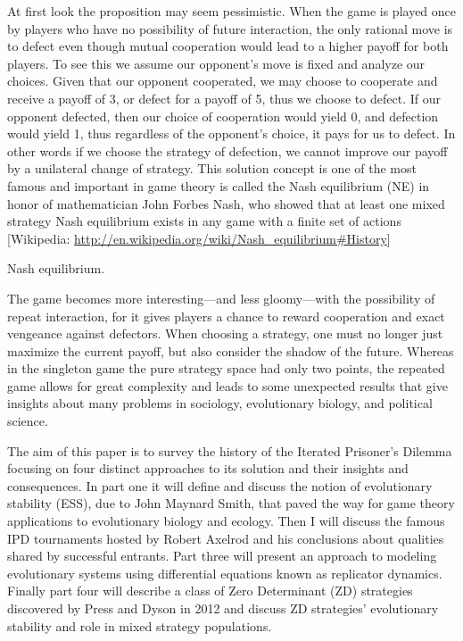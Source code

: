 At first look the proposition may seem pessimistic. When the game is played once by players who have no possibility of future interaction, the only rational move is to defect even though mutual cooperation would lead to a higher payoff for both players. To see this we assume our opponent's move is fixed and analyze our choices. Given that our opponent cooperated, we may choose to cooperate and receive a payoff of 3, or defect for a payoff of 5, thus we choose to defect. If our opponent defected, then our choice of cooperation would yield 0, and defection would yield 1, thus regardless of the opponent's choice, it pays for us to defect. In other words if we choose the strategy of defection, we cannot improve our payoff by a unilateral change of strategy. This solution concept is one of the most famous and important in game theory is called the Nash equilibrium (NE) in honor of mathematician John Forbes Nash, who showed that at least one mixed strategy Nash equilibrium exists in any game with a finite set of actions [Wikipedia: \url{http://en.wikipedia.org/wiki/Nash_equilibrium#History}]
\begin{definition} Nash equilibrium.
\end{definition}

The game becomes more interesting---and less gloomy---with the possibility of repeat interaction, for it gives players a chance to reward cooperation and exact vengeance against defectors. When choosing a strategy, one must no longer just maximize the current payoff, but also consider the shadow of the future. Whereas in the singleton game the pure strategy space had only two points, the repeated game allows for great complexity and leads to some unexpected results that give insights about many problems in sociology, evolutionary biology, and political science.

The aim of this paper is to survey the history of the Iterated Prisoner's Dilemma focusing on four distinct approaches to its solution and their insights and consequences. In part one it will define and discuss the notion of evolutionary stability (ESS), due to John Maynard Smith, that paved the way for game theory applications to evolutionary biology and ecology. Then I will discuss the famous IPD tournaments hosted by Robert Axelrod and his conclusions about qualities shared by successful entrants. Part three will present an approach to modeling evolutionary systems using differential equations known as replicator dynamics. Finally part four will describe a class of Zero Determinant (ZD) strategies discovered by Press and Dyson in 2012 and discuss ZD strategies' evolutionary stability and role in mixed strategy populations.



